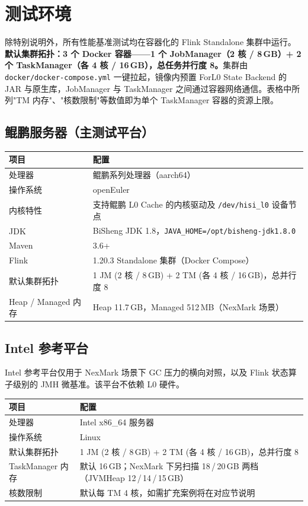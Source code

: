 \documentclass[a4paper,11pt]{article}
\newcommand{\project}{ForL0 State Backend}
\begin{document}
\section{测试环境}

除特别说明外，所有性能基准测试均在容器化的 Flink Standalone 集群中运行。\textbf{默认集群拓扑：3 个 Docker 容器——1 个 JobManager（2 核 / 8\,GB）+ 2 个 TaskManager（各 4 核 / 16\,GB），总任务并行度 8。}集群由 \texttt{docker/docker-compose.yml} 一键拉起，镜像内预置 \project{} 的 JAR 与原生库，JobManager 与 TaskManager 之间通过容器网络通信。表格中所列"TM 内存"、"核数限制"等数值即为单个 TaskManager 容器的资源上限。

\subsection{鲲鹏服务器（主测试平台）}

\begin{table}[H]
\centering
\small
\begin{tabularx}{\textwidth}{L{3.2cm} X}
\toprule
\textbf{项目} & \textbf{配置} \\
\midrule
处理器 & 鲲鹏系列处理器（aarch64） \\
操作系统 & openEuler \\
内核特性 & 支持鲲鹏 L0 Cache 的内核驱动及 \texttt{/dev/hisi\_l0} 设备节点 \\
JDK & BiSheng JDK 1.8，\texttt{JAVA\_HOME=/opt/bisheng-jdk1.8.0} \\
Maven & 3.6+ \\
Flink & 1.20.3 Standalone 集群（Docker Compose） \\
默认集群拓扑 & 1 JM (2 核 / 8\,GB) + 2 TM (各 4 核 / 16\,GB)，总并行度 8 \\
Heap / Managed 内存 & Heap 11.7\,GB，Managed 512\,MB（NexMark 场景） \\
\bottomrule
\end{tabularx}
\end{table}

\subsection{Intel 参考平台}

Intel 参考平台仅用于 NexMark 场景下 GC 压力的横向对照，以及 Flink 状态算子级别的 JMH 微基准。该平台不依赖 L0 硬件。

\begin{table}[H]
\centering
\small
\begin{tabularx}{\textwidth}{L{3.2cm} X}
\toprule
\textbf{项目} & \textbf{配置} \\
\midrule
处理器 & Intel x86\_64 服务器 \\
操作系统 & Linux \\
默认集群拓扑 & 1 JM (2 核 / 8\,GB) + 2 TM (各 4 核 / 16\,GB)，总并行度 8 \\
TaskManager 内存 & 默认 16\,GB；NexMark 下另扫描 18\,/\,20\,GB 两档（JVMHeap 12\,/\,14\,/\,15\,GB） \\
核数限制 & 默认每 TM 4 核，如需扩充案例将在对应节说明 \\
\bottomrule
\end{tabularx}
\end{table}
\end{document}
